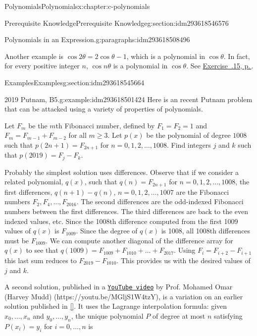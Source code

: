 \documentclass[twoside,10pt,]{book}
\newcommand{\xreffont}{\relax}
\numberwithin{equation}{section}
\begin{document}
\begin{chapterptx}{Polynomials}{}{Polynomials}{}{}{x:chapter:c-polynomials}
\begin{sectionptx}{Prerequisite Knowledge}{}{Prerequisite Knowledge}{}{}{g:section:idm293618546576}
\begin{paragraphs}{Polynomials in an Expression.}{g:paragraphs:idm293618508496}
\par
Another example is \(\cos{2 \theta}= 2 \cos{\theta} - 1\), which is a polynomial in \(\cos{\theta}\).  In fact, for every positive integer \(n\),  \(\cos{n \theta}\) is a polynomial in \(\cos{\theta}\). See \hyperlink{x:exercise:exercise-chebyshev}{Exercise~{\xreffont 9.3.15}, p.\,\pageref{x:exercise:exercise-chebyshev}}.%
\end{paragraphs}%
\end{sectionptx}
%
%
\typeout{************************************************}
\typeout{************************************************}
%
\begin{sectionptx}{Examples}{}{Examples}{}{}{g:section:idm293618545664}
\begin{example}{2019 Putnam, B5.}{g:example:idm293618501424}%
Here is an recent Putnam problem that can be attacked using a variety of properties of polynomials.%
\par
Let \(F_m\) be the \(m\)th Fibonacci number, defined by \(F_1 = F_2 = 1\) and \(F_m = F_{m-1} + F_{m-2}\) for all \(m \geq 3\). Let \(p(x)\) be the polynomial of degree \(1008\) such that \(p(2n+1) = F_{2n+1}\) for \(n=0,1,2,\dots,1008\). Find integers \(j\) and \(k\) such that \(p(2019) = F_j - F_k\).%
\par
Probably the simplest solution uses differences.  Observe that if we consider a related polynomial, \(q(x)\), such that  \(q(n) = F_{2n+1}\) for \(n=0,1,2,\dots,1008\), the first differences, \(q(n+1)-q(n)\), \(n=0,1,2,\dots,1007\) are the Fibonacci numbers \(F_2, F_4, \dots, F_{2016}\). The second differences are the odd-indexed Fibonacci numbers between the first differences.  The third differences are back to the even indexed values, etc.   Since the 1008th difference computed from the first 1009 values of \(q(x)\) is \(F_{1009}\). Since the degree of \(q(x)\) is 1008, all 1008th differences must be  \(F_{1009}\).  We can compute another diagonal of the difference array for \(q(x)\) to see that \(q(1009) = F_{1009}+F_{1010}+\dots +F_{2017}\).  Using \(F_{i}=F_{i+2}-F_{i+1}\) this last sum reduces to \(F_{2019}-F_{1010}\).  This provides us with the desired values of \(j\) and \(k\).%
\par
A second solution, published in a \href{https://youtu.be/MGljS1W4tzY}{\nolinkurl{YouTube video}}  by Prof. Mohamed Omar (Harvey Mudd)  (https:\slash{}\slash{}youtu.be\slash{}MGljS1W4tzY), is a variation on an earlier solution published in \hyperlink{x:biblio:biblio-putnam-archive}{[{\xreffont 10}]}. It uses the Lagrange interpolation formula: given \(x_0,\dots,x_n\) and \(y_0,\dots,y_n\), the unique polynomial \(P\) of degree at most \(n\) satisfying \(P(x_i) = y_i\) for \(i=0,\dots,n\) is%

\end{example}
\end{sectionptx}
\end{chapterptx}
\end{document}
